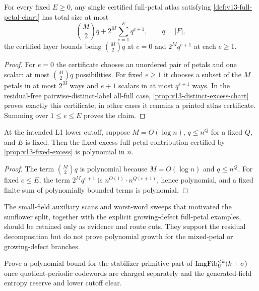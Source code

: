 \begin{proposition}\label{prop:v13-fixed-excess}
For every fixed $E\ge0$, any single certified full-petal atlas satisfying \cref{def:v13-full-petal-chart} has total size at most
\[
        \binom M2 q + 2^M\sum_{e=1}^{E}q^{e+1},
        \qquad q=|F| ,
\]
the certified layer bounds being $\binom M2q$ at $e=0$ and $2^Mq^{e+1}$ at each $e\ge1$.
\end{proposition}

\begin{proof}
For $e=0$ the certificate chooses an unordered pair of petals and one scalar: at most $\binom M2q$ possibilities.  For fixed $e\ge1$ it chooses a subset of the $M$ petals in at most $2^M$ ways and $e+1$ scalars in at most $q^{e+1}$ ways.  In the residual-free pairwise-distinct-label all-full case, \cref{prop:v13-distinct-excess-chart} proves exactly this certificate; in other cases it remains a printed atlas certificate.  Summing over $1\le e\le E$ proves the claim.
\end{proof}

\begin{corollary}\label{cor:v13-fixed-excess-poly}
At the intended L1 lower cutoff, suppose $M=O(\log n)$, $q\le n^Q$ for a fixed $Q$, and $E$ is fixed.  Then the fixed-excess full-petal contribution certified by \cref{prop:v13-fixed-excess} is polynomial in $n$.
\end{corollary}

\begin{proof}
The term $\binom M2q$ is polynomial because $M=O(\log n)$ and $q\le n^Q$.  For fixed $e\le E$, the term $2^Mq^{e+1}$ is $n^{O(1)}\cdot n^{Q(e+1)}$, hence polynomial, and a fixed finite sum of polynomially bounded terms is polynomial.
\end{proof}

\begin{remark}\label{rem:v13-l1-evidence}
The small-field auxiliary scans and worst-word sweeps that motivated the sunflower split, together with the explicit growing-defect full-petal examples, should be retained only as evidence and route cuts.  They support the residual decomposition but do not prove polynomial growth for the mixed-petal or growing-defect branches.
\end{remark}

\begin{problem}\label{prob:v13-primitive-image-fiber}
Prove a polynomial bound for the stabilizer-primitive part of $\operatorname{ImgFib}_U^{<k}(k+\sigma)$ once quotient-periodic codewords are charged separately and the generated-field entropy reserve and lower cutoff clear.
\end{problem}

